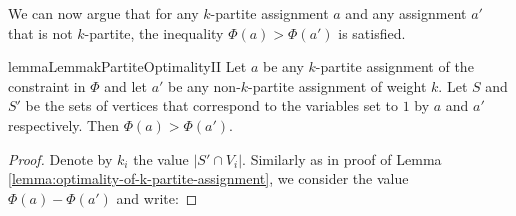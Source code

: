 \documentclass[a4paper,UKenglish,cleveref, autoref, thm-restate,numberwithinsect]{lipics-v2021}
\begin{document}
We can now argue that for any $k$-partite assignment $a$ and any assignment $a'$ that is not $k$-partite, the inequality $\Phi(a)>\Phi(a')$ is satisfied.
\begin{restatable}{lemma}{LemmakPartiteOptimalityII}\label{lemma:case2-optimality-of-k-partite-assignment}
    Let $a$ be any $k$-partite assignment of the constraint in $\Phi$ and let $a'$ be any non-$k$-partite assignment of weight $k$.
    Let $S$ and $S'$ be the sets of vertices that correspond to the variables set to $1$ by $a$ and $a'$ respectively.
    Then $\Phi(a)>\Phi(a')$.
\end{restatable}
\begin{proof}
    Denote by $k_i$ the value $|S'\cap V_i|$.
    Similarly as in proof of Lemma \ref{lemma:optimality-of-k-partite-assignment}, we consider the value $\Phi(a)-\Phi(a')$ and write:


\end{proof}
\end{document}
